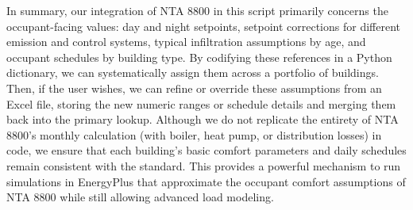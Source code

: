 In summary, our integration of NTA 8800 in this script primarily concerns the occupant-facing values: day and night setpoints, setpoint corrections for different emission and control systems, typical infiltration assumptions by age, and occupant schedules by building type. By codifying these references in a Python dictionary, we can systematically assign them across a portfolio of buildings. Then, if the user wishes, we can refine or override these assumptions from an Excel file, storing the new numeric ranges or schedule details and merging them back into the primary lookup. Although we do not replicate the entirety of NTA 8800’s monthly calculation (with boiler, heat pump, or distribution losses) in code, we ensure that each building’s basic comfort parameters and daily schedules remain consistent with the standard. This provides a powerful mechanism to run simulations in EnergyPlus that approximate the occupant comfort assumptions of NTA 8800 while still allowing advanced load modeling.











